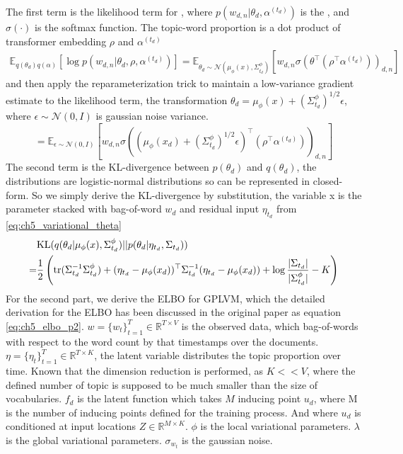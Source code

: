 The first term is the likelihood term for , where $ p(w_{d,n}|\theta_d,\alpha^{(t_d)}) $ is the , and $ \sigma(\cdot) $ is the softmax function. The topic-word proportion is a dot product of transformer embedding $ \rho $ and $ \alpha^{(t_d)} $
\begin{align}
\mathbb{E}_{q(\theta_d)q(\alpha)}[\log p(w_{d,n}|\theta_d,\rho,\alpha^{(t_d)})]=\mathbb{E}_{\theta_d\sim\mathcal{N}(\mu_{\phi}(x),\Sigma^{\phi}_{t_d})}[w_{d,n}\sigma(\theta^\top(\rho^\top\alpha^{(t_d)}))_{d,n}]
\end{align}
and then apply the reparameterization trick to maintain a low-variance gradient estimate to the likelihood term, the transformation $ \theta_d=\mu_{\phi}(x)+(\Sigma^{\phi}_{t_d})^{1/2}\epsilon $, where $ \epsilon\sim\mathcal{N}(0,I) $ is gaussian noise variance.
\begin{equation}\label{eq:ch5_reconstruction}
=\mathbb{E}_{\epsilon\sim\mathcal{N}(0,I)}\left[w_{d,n}\sigma((\mu_{\phi}(x_d)+(\Sigma^{\phi}_{t_d})^{1/2}\epsilon)^\top(\rho^\top\alpha^{(t_d)}))_{d,n}\right]
\end{equation}
The second term is the KL-divergence between $ p(\theta_d) $ and $ q(\theta_d) $, the distributions are logistic-normal distributions so can be represented in closed-form. So we simply derive the KL-divergence by substitution,
the variable x is the parameter stacked with bag-of-word $ w_d $ and residual input $ \eta_{t_d} $ from \ref{eq:ch5_variational_theta}
\begin{align}\label{eq:ch5_kl_theta}
&\text{KL}(q(\theta_d|\mu_{\phi}(x),\Sigma^{\phi}_{t_d})||p(\theta_d|\eta_{t_d},\Sigma_{t_d}))\notag\\
=&\frac{1}{2}\left(\text{tr}(\Sigma_{t_d}^{-1}\Sigma_{t_d}^{\phi})+(\eta_{t_d}-\mu_{\phi}(x_d))^\top\Sigma_{t_d}^{-1}(\eta_{t_d}-\mu_{\phi}(x_d))+\log\frac{|\Sigma_{t_d}|}{|\Sigma^{\phi}_{t_d}|}-K\right)
\end{align}
For the second part, we derive the ELBO for GPLVM, which the detailed derivation for the ELBO has been discussed in the original paper \cite{titsias_bayesian_nodate} as equation \ref{eq:ch5_elbo_p2}. $ w=\{w_t\}^{T}_{t=1}\in\mathbb{R}^{T\times V} $ is the observed data, which bag-of-words with respect to the word count by that timestamps over the documents. $ \eta=\{\eta_t\}^{T}_{t=1}\in\mathbb{R}^{T\times K} $, the latent variable distributes the topic proportion over time. Known that the dimension reduction is performed, as $ K<<V $, where the defined number of topic is supposed to be much smaller than the size of vocabularies.
$ f_d $ is the latent function which takes $ M $ inducing point $ u_d $, where M is the number of inducing points defined for the training process. And where $ u_d $ is conditioned at input locations $ Z\in\mathbb{R}^{M\times K} $. 
$ \phi $ is the local variational parameters. $ \lambda $ is the global variational parameters. $ \sigma_{w_t} $ is the gaussian noise.

